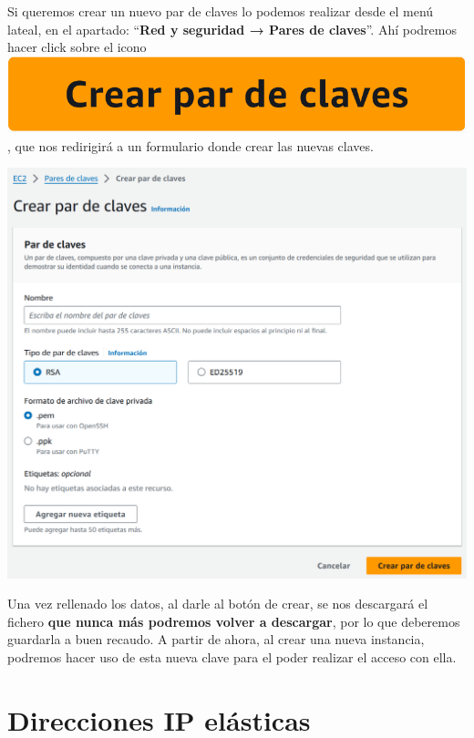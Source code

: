 
Si queremos crear un nuevo par de claves lo podemos realizar desde el menú lateal, en el apartado: “\textbf{Red y seguridad → Pares de claves}”. Ahí podremos hacer click sobre el icono \includegraphics[height=0.8\baselineskip]{img/aws/ec2_new_key.png}, que nos redirigirá a un formulario donde crear las nuevas claves.

\begin{center}
	\includegraphics[frame,width=0.9\linewidth]{img/aws/ec2_new_key2.png}
\end{center}

Una vez rellenado los datos, al darle al botón de crear, se nos descargará el fichero \textbf{que nunca más podremos volver a descargar}, por lo que deberemos guardarla a buen recaudo. A partir de ahora, al crear una nueva instancia, podremos hacer uso de esta nueva clave para el poder realizar el acceso con ella.



\chapter{Direcciones IP elásticas}

